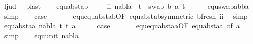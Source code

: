 \begin{isabellebody}
\ l{}{\isacharunderscore}{\kern0pt}jud\ \isamarkupfalse%
\ blast\isanewline
\ \ \isamarkupfalse%
\ equ{\isacharunderscore}{\kern0pt}abst{\isacharunderscore}{\kern0pt}ab{\isacharparenleft}{\kern0pt}{}{\isacharparenright}{\kern0pt}\ \isanewline
\ \ \isamarkupfalse%
\ ii{\isacharcolon}{\kern0pt}\ {\isachardoublequoteopen}nabla\ {\isasymturnstile}\ t{}{\isacharprime}{\kern0pt}\ {\isasymapprox}\ swap\ {\isacharbrackleft}{\kern0pt}{\isacharparenleft}{\kern0pt}b{\isacharcomma}{\kern0pt}\ a{\isacharparenright}{\kern0pt}{\isacharbrackright}{\kern0pt}\ t{}{\isacharprime}{\kern0pt}{\isachardoublequoteclose}\isanewline
\ \ \ \ \isamarkupfalse%
\ equ{\isacharunderscore}{\kern0pt}swap{\isacharunderscore}{\kern0pt}abba\ \isamarkupfalse%
\ simp\isanewline
\ \ \isamarkupfalse%
\ {\isacharquery}{\kern0pt}case\ \isanewline
\ \ \ \ \isamarkupfalse%
\ equ{\isachardot}{\kern0pt}equ{\isacharunderscore}{\kern0pt}abst{\isacharunderscore}{\kern0pt}ab{\isacharbrackleft}{\kern0pt}OF\ equ{\isacharunderscore}{\kern0pt}abst{\isacharunderscore}{\kern0pt}ab{\isacharparenleft}{\kern0pt}{}{\isacharparenright}{\kern0pt}{\isacharbrackleft}{\kern0pt}symmetric{\isacharbrackright}{\kern0pt}\ b{\isacharunderscore}{\kern0pt}fresh\ ii{\isacharbrackright}{\kern0pt}\ \isamarkupfalse%
\ simp\isanewline
{}\isamarkupfalse%
\isanewline
\ \ \isamarkupfalse%
\ {\isacharparenleft}{\kern0pt}equ{\isacharunderscore}{\kern0pt}abst{\isacharunderscore}{\kern0pt}aa\ nabla\ t{}{\isacharprime}{\kern0pt}\ t{}{\isacharprime}{\kern0pt}\ a{\isacharparenright}{\kern0pt}\isanewline
\ \ \isamarkupfalse%
\ \isamarkupfalse%
\ {\isacharquery}{\kern0pt}case\ \isanewline
\ \ \ \ \isamarkupfalse%
\ equ{\isachardot}{\kern0pt}equ{\isacharunderscore}{\kern0pt}abst{\isacharunderscore}{\kern0pt}aa{\isacharbrackleft}{\kern0pt}OF\ equ{\isacharunderscore}{\kern0pt}abst{\isacharunderscore}{\kern0pt}aa{\isacharparenleft}{\kern0pt}{}{\isacharparenright}{\kern0pt}{\isacharcomma}{\kern0pt}\ of\ a{\isacharbrackright}{\kern0pt}\ \isamarkupfalse%
\ simp\isanewline
{}\isamarkupfalse%
\isanewline
\ \ \isamarkupfalse%
\ {\isacharparenleft}{\kern0pt}equ{\isacharunderscore}{\kern0pt}unit\ nabla{\isacharparenright}{\kern0pt}\isanewline
\ \ \isamarkupfalse%

\end{isabellebody}

